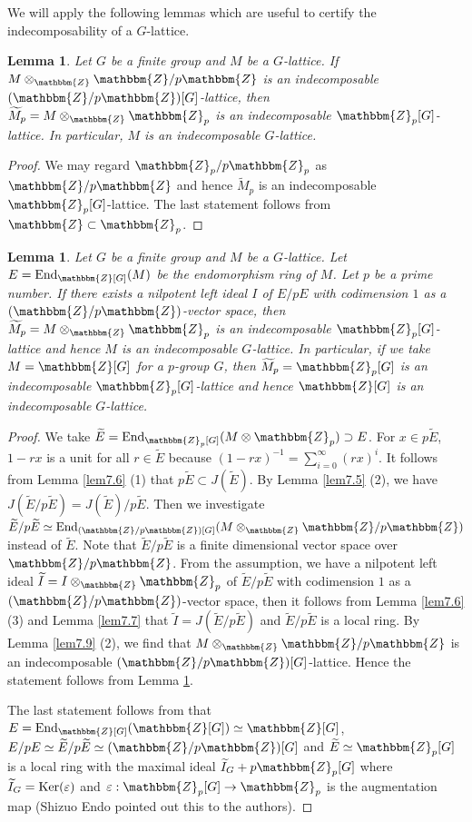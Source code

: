 \documentclass{amsart}
\theoremstyle{plain}
\newtheorem{lemma}[theorem]{Lemma}
\theoremstyle{definition}
\theoremstyle{remark}
\newcommand{\bZ}{\mathbbm{Z}}\newcommand{\bQ}{\mathbbm{Q}}
\newcounter{sub}\def\tr{\mbox{tr }}
\def\End{\mbox{\rm End}}
\begin{document}
We will apply the following lemmas which are useful to certify 
the indecomposability of a $G$-lattice. 

\begin{lemma}\label{lem7.10}
Let $G$ be a finite group and $M$ be a $G$-lattice. 
If $M \otimes_\bZ \bZ/p\bZ$ is an indecomposable 
$(\bZ/p\bZ)[G]$-lattice, then 
$\widetilde{M}_p=M \otimes_\bZ \bZ_p$ 
is an indecomposable $\bZ_p[G]$-lattice. 
In particular, $M$ is an indecomposable $G$-lattice. 
\end{lemma}
%
\begin{proof}
We may regard $\bZ_p/p\bZ_p$ as $\bZ/p\bZ$ and hence 
$\widetilde{M}_p$ is an indecomposable $\bZ_p[G]$-lattice. 
The last statement follows from $\bZ\subset \bZ_p$. 
\end{proof}

\begin{lemma}\label{lem7.11}
Let $G$ be a finite group and $M$ be a $G$-lattice. 
Let $E=\End_{\bZ[G]}(M)$ be the endomorphism ring of $M$. 
Let $p$ be a prime number. 
If there exists a nilpotent left ideal $I$ of $E/pE$ 
with codimension $1$ as a $(\bZ/p\bZ)$-vector space, 
then $\widetilde{M}_p=M \otimes_\bZ \bZ_p$ 
is an indecomposable $\bZ_p[G]$-lattice 
and hence $M$ is an indecomposable $G$-lattice. 
In particular, if we take $M=\bZ[G]$ for a $p$-group $G$, 
then $\widetilde{M}_p=\bZ_p[G]$ is an indecomposable $\bZ_p[G]$-lattice 
and hence $\bZ[G]$ is an indecomposable $G$-lattice. 
\end{lemma}
%
\begin{proof}
We take $\widetilde{E}=\End_{\bZ_p[G]}(M\otimes\bZ_p)\supset E$. 
For $x \in p\widetilde{E}$, $1-rx$ is a unit for all $r\in \widetilde{E}$ 
because $(1-rx)^{-1}=\sum_{i=0}^{\infty}(rx)^i$. 
It follows from Lemma \ref{lem7.6} (1) that 
$p\widetilde{E} \subset J(\widetilde{E})$. 
By Lemma \ref{lem7.5} (2), we have 
$J(\widetilde{E}/p\widetilde{E})=J(\widetilde{E})/p\widetilde{E}$. 
Then we investigate $\widetilde{E}/p\widetilde{E}\simeq 
\End_{(\bZ/p\bZ)[G]}(M \otimes_\bZ \bZ/p\bZ)$ 
instead of $\widetilde{E}$. 
Note that $\widetilde{E}/p\widetilde{E}$ is a finite dimensional vector space 
over $\bZ/p\bZ$. 
From the assumption, we have a nilpotent left ideal 
$\widetilde{I}=I\otimes_\bZ \bZ_p$ of $\widetilde{E}/p\widetilde{E}$ 
with codimension $1$ as a $(\bZ/p\bZ)$-vector space, 
then it follows from Lemma \ref{lem7.6} (3) and Lemma \ref{lem7.7} that 
$\widetilde{I}=J(\widetilde{E}/p\widetilde{E})$ 
and $\widetilde{E}/p\widetilde{E}$ is a local ring. 
By Lemma \ref{lem7.9} (2), we find that 
$M \otimes_\bZ \bZ/p\bZ$ is an indecomposable 
$(\bZ/p\bZ)[G]$-lattice. 
Hence the statement follows from Lemma \ref{lem7.10}. 

The last statement follows from that 
$E=\End_{\bZ[G]}(\bZ[G])\simeq \bZ[G]$, 
$E/pE\simeq \widetilde{E}/p\widetilde{E}\simeq (\bZ/p\bZ)[G]$ 
and $\widetilde{E}\simeq \bZ_p[G]$ is a local ring with the maximal ideal 
$\widetilde{I}_G+p\bZ_p[G]$ where 
$\widetilde{I}_G={\rm Ker}(\varepsilon)$ and 
$\varepsilon : \bZ_p[G]\rightarrow \bZ_p$ is the augmentation map 
(Shizuo Endo pointed out this to the authors). 
\end{proof}
\end{document}
